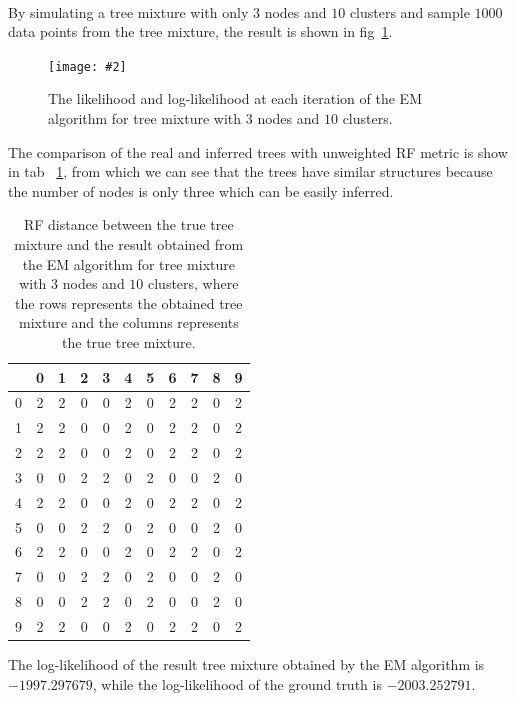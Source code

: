 \documentclass[11pt]{extarticle}
\newcommand{\0}{\mathbf{0}}
\renewcommand{\(}{\left(}
\renewcommand{\)}{\right)}
\theoremstyle{definition}
\newcommand{\image}[3]{
	\begin{figure}[!ht]
		\centering
	    \texttt{[image: \#2]}
		\caption{#3}
		\label{fig:#2}
	\end{figure}
}
\begin{document}
\noindent{} \\
\par By simulating a tree mixture with only $3$ nodes and $10$ clusters and sample $1000$ data points from the tree mixture, the result is shown in fig~\ref{fig:D3_N1000_K10}.
\image{0.9}{D3_N1000_K10}{The likelihood and log-likelihood at each iteration of the EM algorithm for tree mixture with $3$ nodes and $10$ clusters.}
\par The comparison of the real and inferred trees with unweighted RF metric is show in tab~ \ref{tab:RF_D3_N1000_K10}, from which we can see that the trees have similar structures because the number of nodes is only three which can be easily inferred.
	\begin{table}[!ht]
		\centering
		\caption{RF distance between the true tree mixture and the result obtained from the EM algorithm for tree mixture with $3$ nodes and $10$ clusters, where the rows represents the obtained tree mixture and the columns represents the true tree mixture.}
		\begin{tabular}{c|cccccccccc}
			  & 0 & 1 & 2 & 3 & 4 & 5 & 6 & 7 & 8 & 9 \\
			\hline
			0 & 2 & 2 & 0 & 0 & 2 & 0 & 2 & 2 & 0 & 2 \\
			1 & 2 & 2 & 0 & 0 & 2 & 0 & 2 & 2 & 0 & 2 \\
			2 & 2 & 2 & 0 & 0 & 2 & 0 & 2 & 2 & 0 & 2 \\
			3 & 0 & 0 & 2 & 2 & 0 & 2 & 0 & 0 & 2 & 0 \\
			4 & 2 & 2 & 0 & 0 & 2 & 0 & 2 & 2 & 0 & 2 \\
			5 & 0 & 0 & 2 & 2 & 0 & 2 & 0 & 0 & 2 & 0 \\
			6 & 2 & 2 & 0 & 0 & 2 & 0 & 2 & 2 & 0 & 2 \\
			7 & 0 & 0 & 2 & 2 & 0 & 2 & 0 & 0 & 2 & 0 \\
			8 & 0 & 0 & 2 & 2 & 0 & 2 & 0 & 0 & 2 & 0 \\
			9 & 2 & 2 & 0 & 0 & 2 & 0 & 2 & 2 & 0 & 2
		\end{tabular}
		\label{tab:RF_D3_N1000_K10}
	\end{table}
\par The log-likelihood of the result tree mixture obtained by the EM algorithm is $-1997.297679$, while the log-likelihood of the ground truth is $-2003.252791$.
\end{document}

